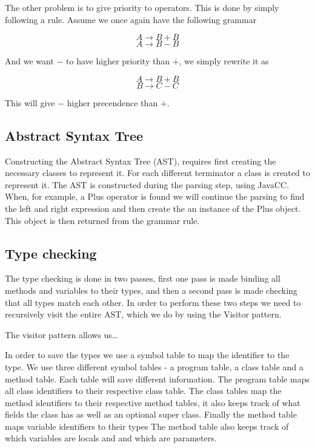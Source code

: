 \documentclass[a4paper]{article}
\begin{document}
The other problem is to give priority to operators. This is done by simply
following a rule. Assume we once again have the following grammar

$$A \rightarrow B + B$$
$$A \rightarrow B - B$$

And we want $-$ to have higher priority than $+$, we simply rewrite it as

$$A \rightarrow B + B$$
$$B \rightarrow C - C$$

This will give $-$ higher precendence than $+$.

\subsection{Abstract Syntax Tree}

Constructing the Abstract Syntax Tree (AST), requires first creating the
necessary classes to represent it. For each different terminator a class is
created to represent it. The AST is constructed during the parsing step, using
JavaCC. When, for example, a Plus operator is found we will continue the parsing
to find the left and right expression and then create the an instance of the
Plus object. This object is then returned from the grammar rule.

\subsection{Type checking}

The type checking is done in two passes, first one pass is made binding all
methods and variables to their types, and then a second pass is made checking
that all types match each other. In order to perform these two steps we need to
recursively visit the entire AST, which we do by using the Visitor pattern.

The visitor pattern allows us\ldots

In order to save the types we use a symbol table to map the identifier to the
type. We use three different symbol tables - a program table, a class table and
a method table. Each table will save different information. The program table
maps all class identifiers to their respective class table. The class tables map
the method identifiers to their respective method tables, it also keeps track of
what fields the class has as well as an optional super class. Finally the method
table maps variable identifiers to their types The method table also keeps track
of which variables are locals and and which are parameters.
\end{document}
